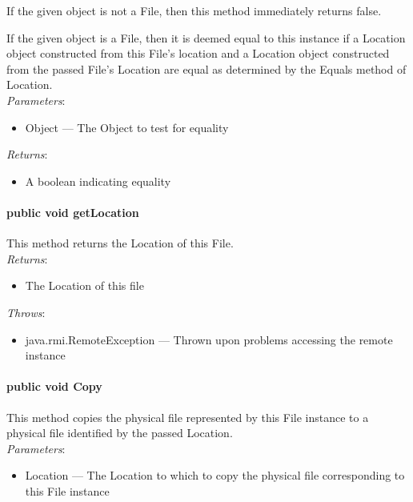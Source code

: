 \documentclass[$Date: 2003/06/26 19:29:31 $]{glabarticle}
\begin{document}
 If the given object is not a File, then this method immediately
 returns false.
 
 If the given object is a File, then it is deemed equal to this
 instance if a Location object constructed from this File's location
 and a Location object constructed from the passed File's Location are
 equal as determined by the Equals method of Location. \\

 \textit{Parameters}:
 \begin{itemize}
 \item[] Object --- The Object to test for equality 
 \end{itemize}
 
 \textit{Returns}:
\begin{itemize}
\item[] A boolean indicating equality
\end{itemize}

\paragraph{public void getLocation}

 This method returns the Location of this File. \\

 \textit{Returns}:
 \begin{itemize}
 \item[] The Location of this file
 \end{itemize}
 
 \textit{Throws}:
 \begin{itemize}
 \item[] java.rmi.RemoteException --- Thrown upon problems accessing the remote instance 
 \end{itemize}
 
\paragraph{public void Copy}

This method copies the physical file represented by this File instance
to a physical file identified by the passed Location. \\

 \textit{Parameters}:
 \begin{itemize}
 \item[] Location --- The Location to which to copy the physical file corresponding to this File instance
 \end{itemize}
 
\end{document}
